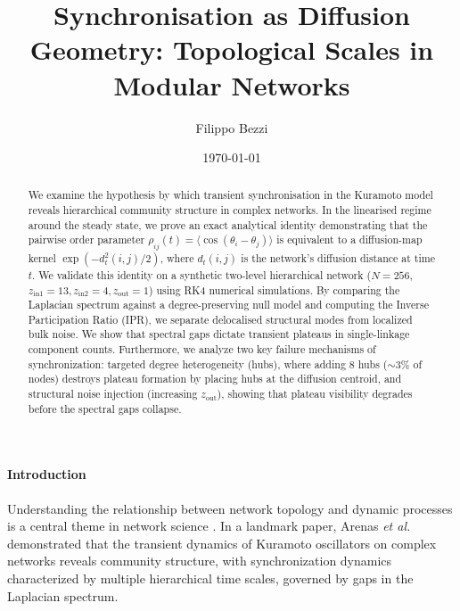 \documentclass[twocolumn,aps,prl,superscriptaddress,nofootinbib]{revtex4-2}
\theoremstyle{plain}
\theoremstyle{definition}
\begin{document}
\title{Synchronisation as Diffusion Geometry: Topological Scales in Modular Networks}
\author{Filippo Bezzi}
\date{\today}

\begin{abstract}
We examine the hypothesis by which transient synchronisation in the Kuramoto model reveals hierarchical community structure in complex networks. In the linearised regime around the steady state, we prove an exact analytical identity demonstrating that the pairwise order parameter $\rho_{ij}(t) = \langle \cos(\theta_i - \theta_j) \rangle$ is equivalent to a diffusion-map kernel $\exp(-d_t^2(i,j)/2)$, where $d_t(i,j)$ is the network's diffusion distance at time $t$. We validate this identity on a synthetic two-level hierarchical network ($N=256$, $z_{\mathrm{in}1}=13, z_{\mathrm{in}2}=4, z_{\mathrm{out}}=1$) using RK4 numerical simulations. By comparing the Laplacian spectrum against a degree-preserving null model and computing the Inverse Participation Ratio (IPR), we separate delocalised structural modes from localized bulk noise. We show that spectral gaps dictate transient plateaus in single-linkage component counts. Furthermore, we analyze two key failure mechanisms of synchronization: targeted degree heterogeneity (hubs), where adding 8 hubs ($\sim 3\%$ of nodes) destroys plateau formation by placing hubs at the diffusion centroid, and structural noise injection (increasing $z_{\mathrm{out}}$), showing that plateau visibility degrades before the spectral gaps collapse.
\end{abstract}

\maketitle

\paragraph{Introduction}
Understanding the relationship between network topology and dynamic processes is a central theme in network science \cite{arenas2008}. In a landmark paper, Arenas \textit{et al.} \cite{arenas2006} demonstrated that the transient dynamics of Kuramoto oscillators on complex networks reveals community structure, with synchronization dynamics characterized by multiple hierarchical time scales, governed by gaps in the Laplacian spectrum.
\end{document}
